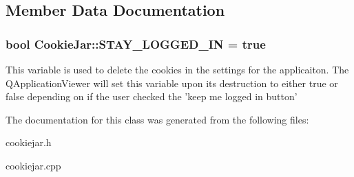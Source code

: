 \subsection{Member Data Documentation}
\hypertarget{classCookieJar_a73f0b1e75f689e85ab833b0f1d680827}{
\subsubsection[{S\-T\-A\-Y\-\_\-\-L\-O\-G\-G\-E\-D\-\_\-\-I\-N}]{\setlength{\rightskip}{0pt plus 5cm}bool Cookie\-Jar\-::\-S\-T\-A\-Y\-\_\-\-L\-O\-G\-G\-E\-D\-\_\-\-I\-N = true\hspace{0.3cm}{\ttfamily [static]}}}\label{classCookieJar_a73f0b1e75f689e85ab833b0f1d680827}
This variable is used to delete the cookies in the settings for the applicaiton. The Q\-Application\-Viewer will set this variable upon its destruction to either true or false depending on if the user checked the 'keep me logged in button' 

The documentation for this class was generated from the following files\-:\begin{DoxyCompactItemize}
\item 
cookiejar.\-h\item 
cookiejar.\-cpp\end{DoxyCompactItemize}
